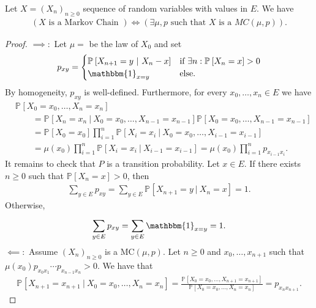 \begin{prop}
	Let $X=(X_n)_{n \geq 0}$ sequence of random variables with values in $E$. We have
	\begin{align}
		(X\textrm{ is a Markov Chain })\iff (\exists \mu, p\textrm{ such that }X\textrm{ is a }MC(\mu, p))
	.\end{align}
	
\end{prop}
\begin{proof}
	$\implies:$ Let $\mu =$ be the law of $X_0$ and set 
	\begin{align}
		p_{xy} = 
	\begin{cases}
		\mathbb{P}_{} \left[ X_{n+1}=y \ | \ X_n -x \right] & \textrm{if } \exists n: \mathbb{P}_{} \left[ X_n = x \right] >0 \\
		\mathbbm{1}_{x=y} & \textrm{else}.
	\end{cases}
	\end{align}
	By homogeneity, $p_{xy}$ is well-defined. Furthermore, for every $x_0,\ldots,x_n \in E$ we have
\begin{align}
& \mathbb{P}_{} \left[ X_0=x_0, \ldots ,X_n=x_n \right] \\ 
	& \qquad = \mathbb{P}_{} \left[ X_n = x_n \ | \ X_0=x_0 , \ldots , X_{n-1}=x_{n-1} \right] \mathbb{P}_{} \left[ X_0=x_0 , \ldots , X_{n-1}=x_{n-1} \right] \\
	& \qquad = \mathbb{P}_{} \left[ X_0 = x_0 \right] \prod_{i=1}^{n} \mathbb{P}_{} \left[ X_i = x_i \ | \ X_0=x_0, \ldots , X_{i-1}=x_{i-1} \right] \\
	& \qquad = \mu(x_0) \prod_{i=1}^n \mathbb{P}_{} \left[ X_i = x_i \ | \ X_{i-1} = x_{i-1}  \right] = \mu(x_0) \prod_{i=1}^n p_{x_{i-1}x_{i}} 
.\end{align}
It remains to check that $P$ is a transition probability. Let $x \in E$. If there exists $n\geq 0$ such that $\mathbb{P}_{} \left[ X_n=x \right] >0$, then 
\begin{align}
	\sum_{y \in E}^{} p_{xy} = \sum_{y \in E}^{} \mathbb{P}_{} \left[ X_{n+1}=y \ | \ X_n =x \right] =1.
\end{align}
Otherwise,
\begin{align}
	\sum_{y \in E}^{} p_{xy} = \sum_{y \in E}^{} \mathbbm{1}_{x=y} =1
.\end{align}
$\impliedby:$ Assume  $(X_n)_{n\geq 0}$ is a MC$(\mu ,p)$. Let $n\geq 0$ and $x_0,\ldots,x_{n+1}$ such that $\mu (x_0) p_{x_0 x_1}\cdots p_{x_{n-1}x_n}>0$. We have that
\begin{align}
	\mathbb{P}_{} \left[ X_{n+1} = x_{n+1} \ | \ X_0 = x_0, \ldots, X_n = x_n \right] = \frac{\mathbb{P}_{} \left[ X_0 = x_0, \ldots, X_{n+1}= x_{n+1} \right] }{\mathbb{P}_{} \left[ X_0=x_0, \ldots, X_n = x_n \right] } = p_{x_nx_{n+1}}.

\end{align}
\end{proof}
